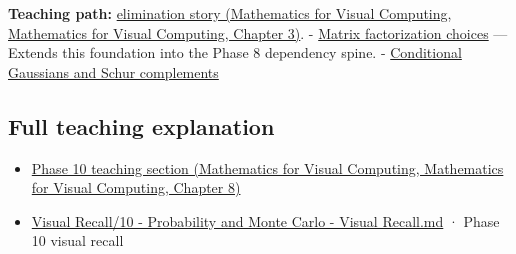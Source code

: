 \textbf{Teaching path:} \href{../02-Mathematics-for-Visual-Computing/main.pdf\#nameddest=01-foundations-i-ch019-elimination-turns-the-geometry-into-an-auditable-calculation}{elimination story (Mathematics for Visual Computing, Mathematics for Visual Computing, Chapter 3)}. - \hyperref[appendix-221a483bec2d]{Matrix factorization choices} --- Extends this foundation into the Phase 8 dependency spine. - \hyperref[appendix-f0437ea55a47]{Conditional Gaussians and Schur complements}

\subsection{Full teaching explanation}\label{appendix-f6e77f4a200f-full-teaching-explanation}

\begin{itemize}
\tightlist
\item
  \href{../02-Mathematics-for-Visual-Computing/main.pdf\#nameddest=02-foundations-ii-ch024-waiting-times-event-counts-and-covariance-geometry}{Phase 10 teaching section (Mathematics for Visual Computing, Mathematics for Visual Computing, Chapter 8)}
\item
  \hyperref[appendix-cb5af353ef77]{Visual Recall/10 - Probability and Monte Carlo - Visual Recall.md} · Phase 10 visual recall
\end{itemize}
